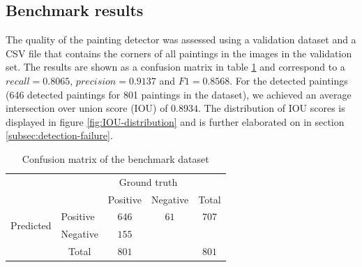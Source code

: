 \subsection{Benchmark results}

The quality of the painting detector was assessed using a validation dataset and a CSV file that contains the corners of all paintings in the images in the validation set. The results are shown as a confusion matrix in table \ref{tab:confusion_matrix_benchmark} and correspond to a $recall = 0.8065$, $precision = 0.9137$ and  $F1 = 0.8568$. For the detected paintings (646 detected paintings for 801 paintings in the dataset), we achieved an average intersection over union score (IOU) of $0.8934$. The distribution of IOU scores is displayed in figure \ref{fig:IOU-distribution} and is further elaborated on in section \ref{subsec:detection-failure}.

\begin{table}[htbp]
    \caption{Confusion matrix of the benchmark dataset}
    \begin{center}
        \begin{tabular}{l|l|c|c|c}
            \multicolumn{2}{c}{}&\multicolumn{2}{c}{Ground truth}&\\
            \cline{3-4}
            \multicolumn{2}{c|}{}&Positive&Negative&\multicolumn{1}{c}{Total}\\
            \cline{2-4}
            \multirow{2}{*}{Predicted}& Positive & $646$ & $61$ & $707$\\
            \cline{2-4}
            & Negative & $155$ &  & \\
            \cline{2-4}
            \multicolumn{1}{c}{} & \multicolumn{1}{c}{Total} & \multicolumn{1}{c}{$801$} & \multicolumn{    1}{c}{} & \multicolumn{1}{c}{$801$}\\
        \end{tabular}
    \end{center}
    \label{tab:confusion_matrix_benchmark}
\end{table}


